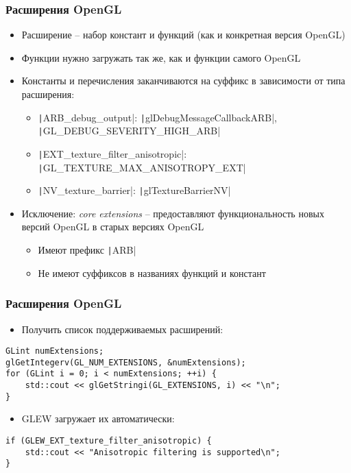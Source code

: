 \documentclass[10pt]{beamer}
\begin{document}
\begin{frame}[fragile]
\frametitle{Расширения OpenGL}
\begin{itemize}
\item Расширение -- набор констант и функций (как и конкретная версия OpenGL)
\pause
\item Функции нужно загружать так же, как и функции самого OpenGL
\pause
\item Константы и перечисления заканчиваются на суффикс в зависимости от типа расширения:
\begin{itemize}
\item \texttt|ARB_debug_output|: \texttt|glDebugMessageCallbackARB|, \texttt|GL_DEBUG_SEVERITY_HIGH_ARB|
\item \texttt|EXT_texture_filter_anisotropic|: \texttt|GL_TEXTURE_MAX_ANISOTROPY_EXT|
\item \texttt|NV_texture_barrier|: \texttt|glTextureBarrierNV|
\end{itemize}
\pause
\item Исключение: \textit{core extensions} -- предоставляют функциональность новых версий OpenGL в старых версиях OpenGL
\begin{itemize}
\item Имеют префикс \texttt|ARB|
\item Не имеют суффиксов в названиях функций и констант
\end{itemize}  
\end{itemize}
\end{frame}

\begin{frame}[fragile]
\frametitle{Расширения OpenGL}
\begin{itemize}
\item Получить список поддерживаемых расширений:
\end{itemize}
\begin{verbatim}
GLint numExtensions;
glGetIntegerv(GL_NUM_EXTENSIONS, &numExtensions);
for (GLint i = 0; i < numExtensions; ++i) {
    std::cout << glGetStringi(GL_EXTENSIONS, i) << "\n";
}
\end{verbatim}
\pause
\begin{itemize}
\item GLEW загружает их автоматически:
\end{itemize}
\begin{verbatim}
if (GLEW_EXT_texture_filter_anisotropic) {
    std::cout << "Anisotropic filtering is supported\n";
}
\end{verbatim}
\end{frame}
\end{document}
